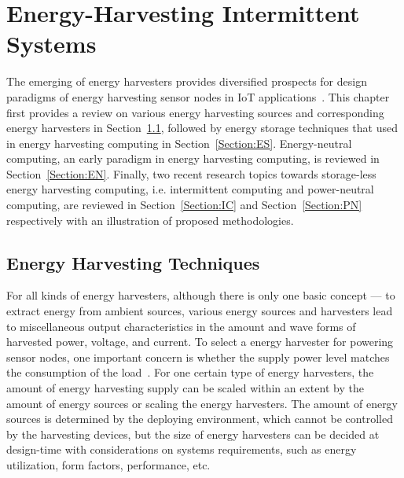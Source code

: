 \chapter{Energy-Harvesting Intermittent Systems} \label{Chapter:Review}

The emerging of energy harvesters provides diversified prospects for design paradigms of energy harvesting sensor nodes in IoT applications~\cite{miorandi2012internet}. This chapter first provides a review on various energy harvesting sources and corresponding energy harvesters in Section~\ref{Section:EH}, followed by energy storage techniques that used in energy harvesting computing in Section~\ref{Section:ES}. Energy-neutral computing, an early paradigm in energy harvesting computing, is reviewed in Section~\ref{Section:EN}. Finally, two recent research topics towards storage-less energy harvesting computing, i.e. intermittent computing and power-neutral computing, are reviewed in Section~\ref{Section:IC} and Section~\ref{Section:PN} respectively with an illustration of proposed methodologies.

\section{Energy Harvesting Techniques} \label{Section:EH}

For all kinds of energy harvesters, although there is only one basic concept --- to extract energy from ambient sources, various energy sources and harvesters lead to miscellaneous output characteristics in the amount and wave forms of harvested power, voltage, and current. To select a energy harvester for powering sensor nodes, one important concern is whether the supply power level matches the consumption of the load~\cite{shaikh2016energy}. For one certain type of energy harvesters, the amount of energy harvesting supply can be scaled within an extent by the amount of energy sources or scaling the energy harvesters. The amount of energy sources is determined by the deploying environment, which cannot be controlled by the harvesting devices, but the size of energy harvesters can be decided at design-time with considerations on systems requirements, such as energy utilization, form factors, performance, etc. 

